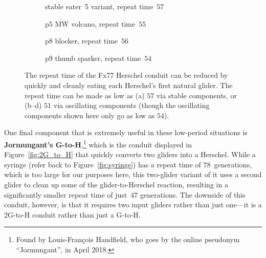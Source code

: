 \begin{figure}[!htb]
	\centering
	\begin{subfigure}{0.25\textwidth}
		\centering
		\caption{stable eater~5 variant, repeat time~$57$}
		\label{fig:fx77_57}
	\end{subfigure} \hfill \begin{subfigure}{.23\textwidth}
		\centering
		\caption{p$5$ MW volcano, repeat time~$55$}
		\label{fig:fx77_p5_eat}
	\end{subfigure} \hfill \begin{subfigure}{.23\textwidth}
		\centering
		\caption{p$8$ blocker, repeat time~$56$}
		\label{fig:fx77_p8_eat}
	\end{subfigure} \hfill \begin{subfigure}{.23\textwidth}
		\centering
		\caption{p$9$ thumb sparker, repeat time~$54$}
		\label{fig:fx77_p9_eat}
	\end{subfigure}
	\caption{The repeat time of the Fx77 Herschel conduit can be reduced by quickly and cleanly eating each Herschel's first natural glider. The repeat time can be made as low as (a) $57$ via stable components, or (b--d) $51$ via oscillating components (though the oscillating components shown here only go as low as $54$).}\label{fig:fx77_fast_eaters}
\end{figure}

One final component that is extremely useful in these low-period situations is \textbf{Jormungant's G-to-H},\footnote{Found by Louis-François Handfield, who goes by the online pseudonym ``Jormungant'', in April 2018.} which is the conduit displayed in Figure~\ref{fig:2G_to_H} that quickly converts two gliders into a Herschel. While a syringe (refer back to Figure~\ref{fig:syringe}) has a repeat time of $78$~generations, which is too large for our purposes here, this two-glider variant of it uses a second glider to clean up some of the glider-to-Herschel reaction, resulting in a significantly smaller repeat time of just~$47$ generations. The downside of this conduit, however, is that it requires two input gliders rather than just one---it is a 2G-to-H conduit rather than just a G-to-H.

